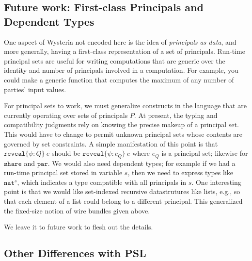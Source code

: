 \documentclass[10pt]{article}
\newcommand{\kw}[1]{\ensuremath{\mathtt{#1}}}
\newcommand{\tnat}{\ensuremath{\mathtt{nat}}}
\newcommand{\ereveal}[3]{\ensuremath{\kw{reveal}\{{#1}\!:\!{#2}\}~{#3}}}
\begin{document}

\subsection{Future work: First-class Principals and Dependent Types}
\label{sec:deptypes}

One aspect of Wysteria not encoded here is the idea of
\emph{principals as data}, and more generally, having a first-class
representation of a set of principals. Run-time principal sets are
useful for writing computations that are generic over the identity and
number of principals involved in a computation. For example, you could
make a generic function that computes the maximum of any number of
parties' input values.

For principal sets to work, we must generalize constructs in the
language that are currently operating over sets of principals $P$. At
present, the typing and compatibility judgments rely on knowing the
precise makeup of a principal set. This would have to change to permit
unknown principal sets whose contents are governed by set
constraints. A simple manifestation of this point is that
$\ereveal{\psi}{Q}{e}$ should be $\ereveal{\psi}{e_Q}{e}$
where $e_Q$ is a principal set; likewise for $\kw{share}$
and $\kw{par}$. We would also need dependent types; for example if we
had a run-time principal set stored in variable $s$, then we need to
express types like $\tnat^s$, which indicates a type compatible with
all principals in $s$. One interesting point is that we would like
set-indexed recursive datastrutures like lists, e.g., so that each
element of a list could belong to a different principal. This
generalized the fixed-size notion of wire bundles given above.

We leave it to future work to flesh out the details. 

\subsection{Other Differences with PSL}
\end{document}
